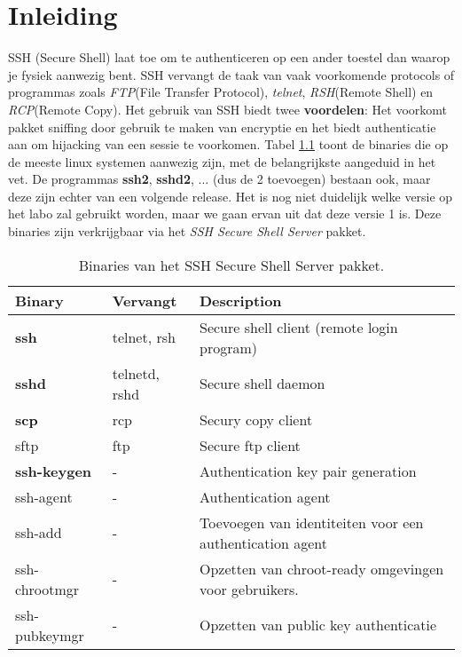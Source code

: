 \documentclass{report}
\begin{document}
	\tableofcontents
	
	\chapter{Inleiding}
	SSH (Secure Shell) laat toe om te authenticeren op een ander toestel dan waarop je fysiek aanwezig bent. SSH vervangt de taak van vaak voorkomende protocols of programmas zoals \textit{FTP}(File Transfer Protocol), \textit{telnet}, \textit{RSH}(Remote Shell) en \textit{RCP}(Remote Copy).
	Het gebruik van SSH biedt twee \textbf{voordelen}: Het voorkomt pakket sniffing door gebruik te maken van encryptie en het biedt authenticatie aan om hijacking van een sessie te voorkomen. Tabel \ref{table:binaries} toont de binaries die op de meeste linux systemen aanwezig zijn, met de belangrijkste aangeduid in het vet. De programmas \textbf{ssh2}, \textbf{sshd2}, ... (dus de 2 toevoegen) bestaan ook, maar deze zijn echter van een volgende release. Het is nog niet duidelijk welke versie op het labo zal gebruikt worden, maar we gaan ervan uit dat deze versie 1 is. Deze binaries zijn verkrijgbaar via het \textit{SSH Secure Shell Server} pakket.
	\begin{table}[h]
		\begin{tabular}{l | l | l}
			\textbf{Binary} & \textbf{Vervangt} & \textbf{Description} \\
			\hline
			\textbf{ssh} & telnet, rsh & Secure shell client (remote login program) \\
			\textbf{sshd} & telnetd, rshd & Secure shell daemon \\
			\textbf{scp} & rcp & Secury copy client \\
			sftp & ftp & Secure ftp client \\
			\textbf{ssh-keygen} & - & Authentication key pair generation \\
			ssh-agent & - & Authentication agent \\
			ssh-add & - & Toevoegen van identiteiten voor een authentication agent \\
			ssh-chrootmgr & - & Opzetten van chroot-ready omgevingen voor gebruikers. \\
			ssh-pubkeymgr & - & Opzetten van public key authenticatie
		\end{tabular}
	\caption{Binaries van het SSH Secure Shell Server pakket.} 
	\label{table:binaries}
	\end{table}
	
\end{document}

